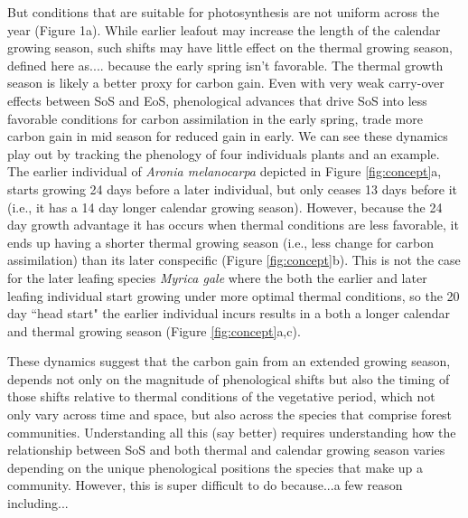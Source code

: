 \documentclass[12 pt]{article}
\begin{document}
But conditions that are suitable for photosynthesis are not uniform across the year (Figure 1a). While earlier leafout may increase the length of the calendar growing season, such shifts may have little effect on the thermal growing season, defined here as....\citep{} because the early spring isn't favorable. The thermal growth season is likely a better proxy for carbon gain. Even with very weak carry-over effects between SoS and EoS, phenological advances that drive SoS into less favorable conditions for carbon assimilation in the early spring, trade more carbon gain in mid season for reduced gain in early. 
We can see these dynamics play out by tracking the phenology of four individuals plants and an example. The earlier individual of \emph{Aronia melanocarpa} depicted in Figure \ref{fig:concept}a, starts growing 24 days before a later individual, but only ceases 13 days before it (i.e., it has a 14 day longer calendar growing season). However, because the 24 day growth advantage it has occurs when thermal conditions are less favorable, it ends up having a shorter thermal growing season (i.e., less change for carbon assimilation) than its later conspecific (Figure \ref{fig:concept}b). This is not the case for the later leafing species \emph{Myrica gale} where the both the earlier and later leafing individual start growing under more optimal thermal conditions, so the 20 day ``head start" the earlier individual incurs results in a both a longer calendar and thermal growing season (Figure \ref{fig:concept}a,c). 

These dynamics suggest that the carbon gain from an extended growing season, depends not only on the magnitude of phenological shifts but also the timing of those shifts relative to thermal conditions of the vegetative period, which not only vary across time and space, but also across the species that comprise forest communities. Understanding all this (say better) requires  understanding how the relationship between SoS and both thermal and calendar growing season varies depending on the unique phenological positions the species that make up a community. However, this is super difficult to do because...a few reason including...  
\end{document}
